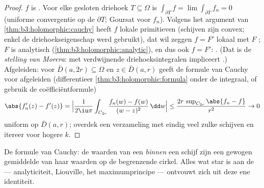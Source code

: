 \begin{proof}
$f$ is . Voor elke gesloten driehoek $T \subseteq \Omega$
is $\int_{\partial T}f = \lim\int_{\partial T}f_n = 0$ (uniforme
convergentie op de  $\partial T$; Goursat voor $f_n$).
Volgens het argument van \cref{thm:b3:holomorphic:cauchy} heeft
$f$ lokale primitieven (schijven zijn convex; enkel de
driehoekseigenschap werd gebruikt), dat wil zeggen $f = F'$
lokaal met $F$ ; $F$ is analytisch
(\cref{thm:b3:holomorphic:analytic}), en dus ook $f = F'$:
. (Dat is de \emph{stelling van Morera}:  met verdwijnende driehoeksintegralen
impliceert .) Afgeleiden: voor $\bar D(a, 2r) \subseteq
\Omega$ en $z \in \bar D(a, r)$ geeft de formule van Cauchy voor
afgeleiden (differentieer \cref{thm:b3:holomorphic:formula} onder
de integraal, of gebruik de coëfficiëntformule)
\[
\abs{f_n'(z) - f'(z)} =
\Bigl|\frac{1}{2\iu\pi}\int_{C_{2r}}\frac{f_n(w) - f(w)}{(w -
z)^2}\,\dd w\Bigr|
\leq \frac{2r\,\sup_{C_{2r}}\abs{f_n - f}}{r^2} \to 0
\]
uniform op $\bar D(a,r)$; overdek een  verzameling met
eindig veel zulke schijven en itereer voor hogere $k$.
\end{proof}

\begin{omfigure}

{\small De formule van Cauchy: de waarden van een  \emph{binnen} een schijf zijn een gewogen gemiddelde van
haar waarden op de begrenzende cirkel. Alles wat star is aan de
 --- analyticiteit, Liouville, het maximumprincipe ---
ontvouwt zich uit deze ene identiteit.}
\end{omfigure}

